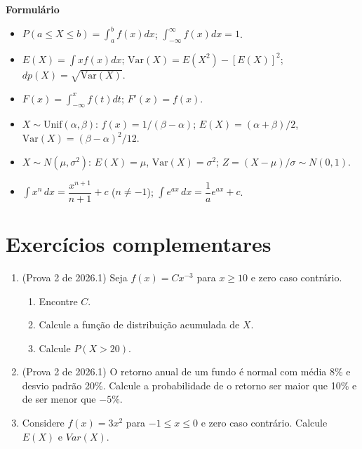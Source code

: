 \documentclass[11pt]{article}
\begin{document}
\vspace{1cm}
\begin{center}
\Large\textbf{Formulário}
\end{center}
\begin{small}
\begin{itemize}
  \item $P(a\le X\le b)=\int_a^b f(x)dx$; $\int_{-\infty}^{\infty} f(x)dx=1$.
  \item $E(X)=\int xf(x)dx$; $\mathrm{Var}(X)=E(X^2)-[E(X)]^2$; $dp(X)=\sqrt{\mathrm{Var}(X)}$.
  \item $F(x)=\int_{-\infty}^x f(t)dt$; $F'(x)=f(x)$.
  \item $X\sim\text{Unif}(\alpha,\beta)$: $f(x)=1/(\beta-\alpha)$; $E(X)=(\alpha+\beta)/2$,
    $\mathrm{Var}(X)=(\beta-\alpha)^2/12$.
  \item $X\sim N(\mu,\sigma^2)$: $E(X)=\mu$, $\mathrm{Var}(X)=\sigma^2$; $Z=(X-\mu)/\sigma\sim
    N(0,1)$.
  \item $\int x^n\,dx = \dfrac{x^{n+1}}{n+1}+c$ ($n\ne-1$); $\displaystyle\int e^{ax}\,dx =
    \dfrac1a e^{ax}+c$.
\end{itemize}
\end{small}


\bigskip
\section*{Exercícios complementares}

\begin{enumerate}[label=\textbf{C\arabic*.}, leftmargin=*]
\item (Prova 2 de 2026.1) Seja $f(x) = Cx^{-3}$ para $x \geq 10$ e zero caso contrário.
\begin{enumerate}[label=(\alph*)]
  \item Encontre $C$.
  \item Calcule a função de distribuição acumulada de $X$.
  \item Calcule $P(X > 20)$.
\end{enumerate}
\item (Prova 2 de 2026.1) O retorno anual de um fundo é normal com média 8\% e desvio padrão 20\%. Calcule a probabilidade de o retorno ser maior que 10\% e de ser menor que $-5\%$.
\item Considere $f(x) = 3x^2$ para $-1 \leq x \leq 0$ e zero caso contrário. Calcule $E(X)$ e $Var(X)$.

\end{enumerate}
\end{document}
